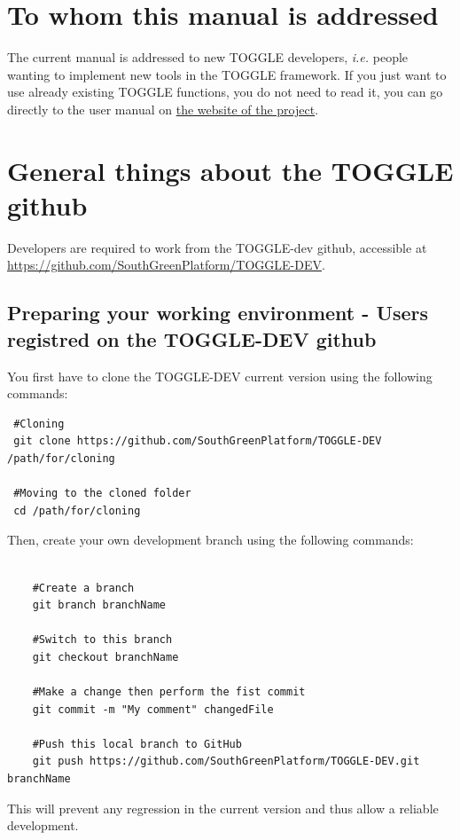 \documentclass[a4paper,10pt]{report}
\begin{document}
\section{To whom this manual is addressed}
The current manual is addressed to new TOGGLE developers, \textit{i.e.} people wanting to implement new tools in the TOGGLE framework.
If you just want to use already existing TOGGLE functions, you do not need to read it, you can go directly to the user manual on \href{http://toggle.southgreen.fr}{the website of the project}.

\section{General things about the TOGGLE github}
Developers are required to work from the TOGGLE-dev github, accessible at \url{https://github.com/SouthGreenPlatform/TOGGLE-DEV}.

\subsection{Preparing your working environment - Users registred on the TOGGLE-DEV github}

You first have to clone the TOGGLE-DEV current version using the following commands:

\begin{verbatim}
 #Cloning
 git clone https://github.com/SouthGreenPlatform/TOGGLE-DEV /path/for/cloning
 
 #Moving to the cloned folder
 cd /path/for/cloning
\end{verbatim}

Then, create your own development branch using the following commands:

\begin{verbatim}
 
    #Create a branch
    git branch branchName

    #Switch to this branch
    git checkout branchName

    #Make a change then perform the fist commit
    git commit -m "My comment" changedFile

    #Push this local branch to GitHub
    git push https://github.com/SouthGreenPlatform/TOGGLE-DEV.git branchName

\end{verbatim}

This will prevent any regression in the current version and thus allow a reliable development.
\end{document}
